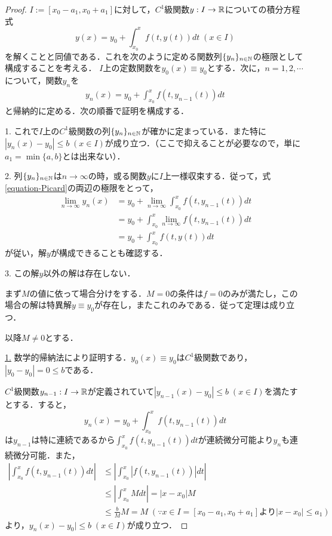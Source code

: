 \documentclass[uplatex,dvipdfmx]{jsreport}
\begin{document}
\begin{proof}
    $I:=[x_0-a_1,x_0+a_1]$に対して，$C^1$級関数$y:I\to\mathbb{R}$についての積分方程式
    \[ y(x) = y_0 + \int^x_{x_0}f(t,y(t))dt \;(x\in I)\]
    を解くことと同値である．これを次のように定める関数列$\{y_n\}_{n\in\mathbb{N}}$の極限として構成することを考える．
    $I$上の定数関数を$y_0(x)\equiv y_0$とする．次に，$n=1,2,\cdots$について，関数$y_n$を
    \begin{align}\label{equation-Picard}
        y_n(x) = y_0 + \int^x_{x_0}f(t,y_{n-1}(t))dt
    \end{align}
    と帰納的に定める．次の順番で証明を構成する．

    1. これで$I$上の$C^1$級関数の列$\{y_n\}_{n\in\mathbb{N}}$が確かに定まっている．また特に$|y_n(x)-y_0|\le b\;(x\in I)$が成り立つ．（ここで抑えることが必要なので，単に$a_1=\min\{a,b\}$とは出来ない）．

    2. 列$\{y_n\}_{n\in\mathbb{N}}$は$n\to\infty$の時，或る関数$y$に$I$上一様収束する．従って，式\ref{equation-Picard}の両辺の極限をとって，
    \begin{align*}
        \lim_{n\to\infty}y_n(x) &= y_0 + \lim_{n\to\infty}\int^x_{x_0}f(t,y_{n-1}(t))dt \\
        &= y_0 + \int^x_{x_0}\lim_{n\to\infty}f(t,y_{n-1}(t))dt\\
        &= y_0 + \int^x_{x_0}f(t,y(t))dt
    \end{align*}
    が従い，解$y$が構成できることも確認する．

    3. この解$y$以外の解は存在しない．

    まず$M$の値に依って場合分けをする．$M=0$の条件は$f=0$のみが満たし，この場合の解は特異解$y\equiv y_0$が存在し，またこれのみである．従って定理は成り立つ．

    以降$M\ne 0$とする．

    \underline{1.} 数学的帰納法により証明する．$y_0(x)\equiv y_0$は$C^1$級関数であり，$|y_0-y_0|=0\le b$である．

    $C^1$級関数$y_{n-1}:I\to\mathbb{R}$が定義されていて$|y_{n-1}(x)-y_0|\le b\;(x\in I)$を満たすとする．すると，
    \[ y_n(x) = y_0 + \int^x_{x_0}f(t,y_{n-1}(t))dt \]
    は$y_{n-1}$は特に連続であるから$\int^x_{x_0}f(t,y_{n-1}(t))dt$が連続微分可能より$y_n$も連続微分可能．また，
    \begin{align*}
        \left| \int^x_{x_0}f(t,y_{n-1}(t))dt \right| &\le \left| \int^x_{x_0}|f(t,y_{n-1}(t))|dt \right|\\
        &\le \left|\int^x_{x_0}Mdt\right| = |x-x_0|M\\
        &\le \frac{b}{M}M = M\;(\because x\in I=[x_0-a_1,x_0+a_1]より|x-x_0|\le a_1)
    \end{align*}
    より，$y_n(x)-y_0|\le b\;(x\in I)$が成り立つ．


\end{proof}
\end{document}
